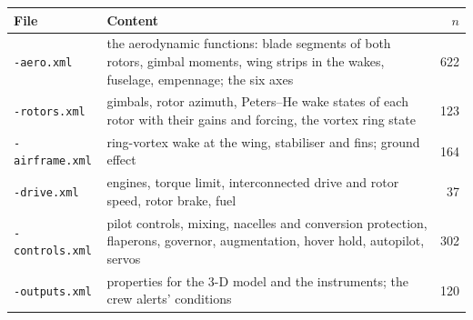 \begin{tabularx}{\columnwidth}{@{}>{\raggedright\arraybackslash}p{2.15cm}>{\raggedright\arraybackslash}X r@{}}
\toprule
File & Content & $n$ \\
\midrule
\texttt{-aero.xml} & the aerodynamic functions: blade segments of both rotors, gimbal moments, wing strips in the wakes, fuselage, empennage; the six axes & 622 \\
\texttt{-rotors.xml} & gimbals, rotor azimuth, Peters--He wake states of each rotor with their gains and forcing, the vortex ring state & 123 \\
\texttt{-airframe.xml} & ring-vortex wake at the wing, stabiliser and fins; ground effect & 164 \\
\texttt{-drive.xml} & engines, torque limit, interconnected drive and rotor speed, rotor brake, fuel & 37 \\
\texttt{-controls.xml} & pilot controls, mixing, nacelles and conversion protection, flaperons, governor, augmentation, hover hold, autopilot, servos & 302 \\
\texttt{-outputs.xml} & properties for the 3-D model and the instruments; the crew alerts' conditions & 120 \\
\bottomrule
\end{tabularx}
